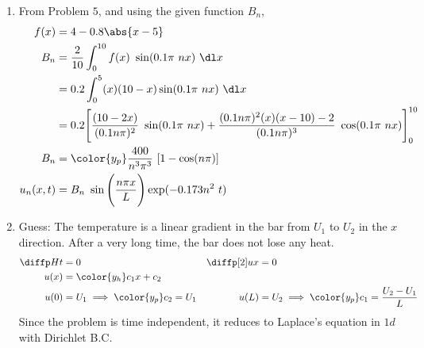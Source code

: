 \begin{enumerate}
    \item From Problem $ 5 $, and using the given function $ B_n $,
          \begin{align}
              f(x)      & = 4 - 0.8 \abs{x-5}                                        \\
              B_n       & = \frac{2}{10} \int_{0}^{10} f(x)\ \sin(0.1\pi\ nx)\ \dl x \\
                        & = 0.2\int_{0}^{5} (x)(10-x) \sin(0.1\pi\ nx)\ \dl x        \\
                        & = 0.2\Bigg[ \frac{(10-2x)}{(0.1n\pi)^2}\ \sin(
                  0.1\pi\ nx) + \frac{(0.1n\pi)^2(x)(x-10) - 2}{(0.1n\pi)^3}
              \ \cos(0.1\pi\ nx) \Bigg]_0^{10}                                       \\
              B_n       & = \color{y_p} \frac{400}{n^3 \pi^3}\ [1 - \cos(n\pi)]      \\
              u_n(x, t) & = B_n\ \sin\Bigg( \frac{n\pi x}{L} \Bigg)
              \exp(-0.173n^2\ t)
          \end{align}

    \item Guess: The temperature is a linear gradient in the bar from $ U_1 $ to
          $ U_2 $ in the $ x $ direction. After a very long time, the bar does not lose
          any heat.
          \begin{align}
              \diffp Ht    & = 0                                                  &
              \diffp[2] ux & = 0                                                    \\
              u(x)         & = \color{y_h} c_1x + c_2                               \\
              u(0)         & = U_1 \implies \color{y_p} c_2 = U_1                 &
              u(L)         & = U_2 \implies \color{y_p} c_1 = \frac{U_2 - U_1}{L}
          \end{align}
          Since the problem is time independent, it reduces to Laplace's equation in
          $ 1d $ with Dirichlet B.C.


\end{enumerate}
